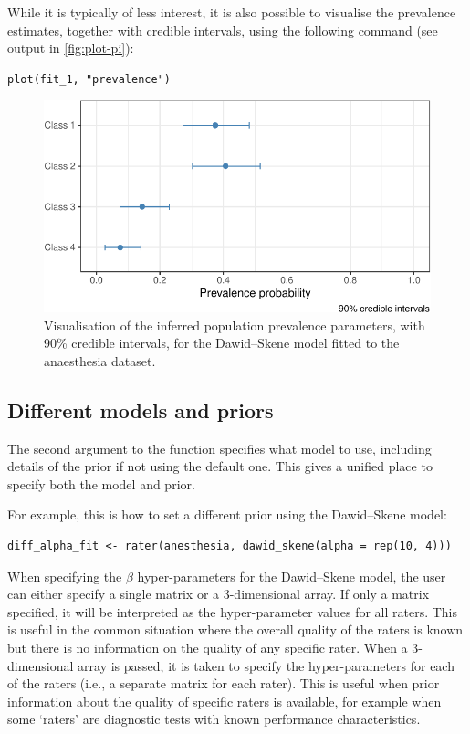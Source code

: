 While it is typically of less interest, it is also possible to visualise the
prevalence estimates, together with credible intervals, using the following
command (see output in \autoref{fig:plot-pi}):

\begin{verbatim}
plot(fit_1, "prevalence")
\end{verbatim}

\begin{figure}

{\centering \includegraphics{RJ-2023-064_files/figure-latex/plot-pi-1} 

}

\caption{Visualisation of the inferred population prevalence parameters, with 90\% credible intervals, for the Dawid--Skene model fitted to the anaesthesia dataset.}\label{fig:plot-pi}
\end{figure}

\hypertarget{sec:different-models-priors}{%
\subsection{Different models and priors}\label{sec:different-models-priors}}

The second argument to the  function specifies what model to use,
including details of the prior if not using the default one. This gives a
unified place to specify both the model and prior.

For example, this is how to set a different prior using the Dawid--Skene model:

\begin{verbatim}
diff_alpha_fit <- rater(anesthesia, dawid_skene(alpha = rep(10, 4)))
\end{verbatim}

When specifying the \(\beta\) hyper-parameters for the Dawid--Skene model, the
user can either specify a single matrix or a 3-dimensional array. If only a matrix
specified, it will be interpreted as the hyper-parameter values for all raters.
This is useful in the common situation where the overall quality of the raters
is known but there is no information on the quality of any specific rater.
When a 3-dimensional array is passed, it is taken to specify the hyper-parameters
for each of the raters (i.e., a separate matrix for each rater). This is
useful when prior information about the quality of specific raters is
available, for example when some `raters' are diagnostic tests with known
performance characteristics.

